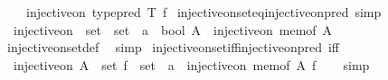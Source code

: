 \begin{isabellebody}
\ \ \ \ injective{\isacharunderscore}{\kern0pt}on\ {\isacharparenleft}{\kern0pt}type{\isacharunderscore}{\kern0pt}pred\ T{\isacharparenright}{\kern0pt}\ f{\isachardoublequoteclose}\isanewline
{}\isamarkupfalse%
\isanewline
\isanewline
{}\isamarkupfalse%
\ injective{\isacharunderscore}{\kern0pt}on{\isacharunderscore}{\kern0pt}set{\isacharunderscore}{\kern0pt}eq{\isacharunderscore}{\kern0pt}injective{\isacharunderscore}{\kern0pt}on{\isacharunderscore}{\kern0pt}pred\ {\isacharbrackleft}{\kern0pt}simp{\isacharbrackright}{\kern0pt}{\isacharcolon}{\kern0pt}\isanewline
\ \ {\isachardoublequoteopen}{\isacharparenleft}{\kern0pt}injective{\isacharunderscore}{\kern0pt}on\ {\isacharcolon}{\kern0pt}{\isacharcolon}{\kern0pt}\ set\ {\isasymRightarrow}\ {\isacharparenleft}{\kern0pt}set\ {\isasymRightarrow}\ {\isacharprime}{\kern0pt}a{\isacharparenright}{\kern0pt}\ {\isasymRightarrow}\ bool{\isacharparenright}{\kern0pt}\ A\ {\isacharequal}{\kern0pt}\ injective{\isacharunderscore}{\kern0pt}on\ {\isacharparenleft}{\kern0pt}mem{\isacharunderscore}{\kern0pt}of\ A{\isacharparenright}{\kern0pt}{\isachardoublequoteclose}\isanewline
%
\isadelimproof
\ \ %
\endisadelimproof
%
\isatagproof
{}\isamarkupfalse%
\ injective{\isacharunderscore}{\kern0pt}on{\isacharunderscore}{\kern0pt}set{\isacharunderscore}{\kern0pt}def\ \isamarkupfalse%
\ simp%
\endisatagproof
{\isafoldproof}%
%
\isadelimproof
\isanewline
%
\endisadelimproof
\isanewline
{}\isamarkupfalse%
\ injective{\isacharunderscore}{\kern0pt}on{\isacharunderscore}{\kern0pt}set{\isacharunderscore}{\kern0pt}iff{\isacharunderscore}{\kern0pt}injective{\isacharunderscore}{\kern0pt}on{\isacharunderscore}{\kern0pt}pred\ {\isacharbrackleft}{\kern0pt}iff{\isacharbrackright}{\kern0pt}{\isacharcolon}{\kern0pt}\isanewline
\ \ {\isachardoublequoteopen}injective{\isacharunderscore}{\kern0pt}on\ {\isacharparenleft}{\kern0pt}A\ {\isacharcolon}{\kern0pt}{\isacharcolon}{\kern0pt}\ set{\isacharparenright}{\kern0pt}\ {\isacharparenleft}{\kern0pt}f\ {\isacharcolon}{\kern0pt}{\isacharcolon}{\kern0pt}\ set\ {\isasymRightarrow}\ {\isacharprime}{\kern0pt}a{\isacharparenright}{\kern0pt}\ {\isasymlongleftrightarrow}\ injective{\isacharunderscore}{\kern0pt}on\ {\isacharparenleft}{\kern0pt}mem{\isacharunderscore}{\kern0pt}of\ A{\isacharparenright}{\kern0pt}\ f{\isachardoublequoteclose}\isanewline
%
\isadelimproof
\ \ %
\endisadelimproof
%
\isatagproof
{}\isamarkupfalse%
\ simp%
\endisatagproof
{\isafoldproof}%
%
\isadelimproof
\isanewline
%
\endisadelimproof
\isanewline

\end{isabellebody}

